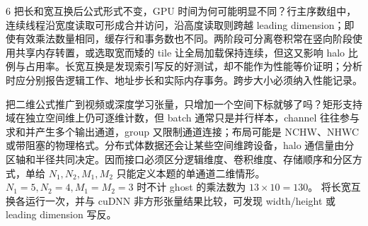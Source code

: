 \begin{solutionexercise}{6}
把长和宽互换后公式形式不变，GPU 时间为何可能明显不同？行主序数组中，连续线程沿宽度读取可形成合并访问，沿高度读取则跨越 leading dimension；即使有效乘法数量相同，缓存行和事务数也不同。两阶段可分离卷积常在竖向阶段使用共享内存转置，或选取宽而矮的 tile 让全局加载保持连续，但这又影响 halo 比例与占用率。长宽互换是发现索引写反的好测试，却不能作为性能等价证明；分析时应分别报告逻辑工作、地址步长和实际内存事务。跨步大小必须纳入性能记录。

把二维公式推广到视频或深度学习张量，只增加一个空间下标就够了吗？矩形支持域在独立空间维上仍可逐维计数，但 batch 通常只是并行样本，channel 往往参与求和并产生多个输出通道，group 又限制通道连接；布局可能是 NCHW、NHWC 或带阻塞的物理格式。分布式体数据还会让某些空间维跨设备，halo 通信量由分区轴和半径共同决定。因而接口必须区分逻辑维度、卷积维度、存储顺序和分区方式，单给 $N_1,N_2,M_1,M_2$ 只能定义本题的单通道二维情形。
\variantheading $N_1=5,N_2=4,M_1=M_2=3$ 时不计 ghost 的乘法数为 $13\times10=130$。
\practiceheading 将长宽互换各运行一次，并与 cuDNN 非方形张量结果比较，可发现 width/height 或 leading dimension 写反。
\end{solutionexercise}

